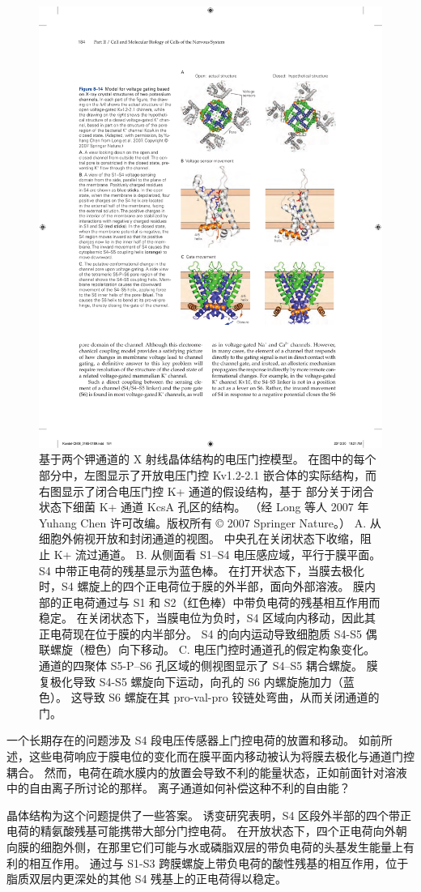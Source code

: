 \begin{figure}[htbp]
	\centering
	\includegraphics[width=0.6\linewidth]{chap08/fig_8_14}
	\caption{基于两个钾通道的 X 射线晶体结构的电压门控模型。 在图中的每个部分中，左图显示了开放电压门控 Kv1.2-2.1 嵌合体的实际结构，而右图显示了闭合电压门控 K+ 通道的假设结构，基于 部分关于闭合状态下细菌 K+ 通道 KcsA 孔区的结构。 （经 Long 等人 2007 年 Yuhang Chen 许可改编。版权所有 © 2007 Springer Nature。） A. 从细胞外俯视开放和封闭通道的视图。 中央孔在关闭状态下收缩，阻止 K+ 流过通道。 B. 从侧面看 S1–S4 电压感应域，平行于膜平面。 S4 中带正电荷的残基显示为蓝色棒。 在打开状态下，当膜去极化时，S4 螺旋上的四个正电荷位于膜的外半部，面向外部溶液。 膜内部的正电荷通过与 S1 和 S2（红色棒）中带负电荷的残基相互作用而稳定。 在关闭状态下，当膜电位为负时，S4 区域向内移动，因此其正电荷现在位于膜的内半部分。 S4 的向内运动导致细胞质 S4-S5 偶联螺旋（橙色）向下移动。 C. 电压门控时通道孔的假定构象变化。 通道的四聚体 S5-P–S6 孔区域的侧视图显示了 S4–S5 耦合螺旋。 膜复极化导致 S4-S5 螺旋向下运动，向孔的 S6 内螺旋施加力（蓝色）。 这导致 S6 螺旋在其 pro-val-pro 铰链处弯曲，从而关闭通道的门。}
	\label{fig:8_14}
\end{figure}


一个长期存在的问题涉及 S4 段电压传感器上门控电荷的放置和移动。 
如前所述，这些电荷响应于膜电位的变化而在膜平面内移动被认为将膜去极化与通道门控耦合。 
然而，电荷在疏水膜内的放置会导致不利的能量状态，正如前面针对溶液中的自由离子所讨论的那样。 
离子通道如何补偿这种不利的自由能？


晶体结构为这个问题提供了一些答案。 
诱变研究表明，S4 区段外半部的四个带正电荷的精氨酸残基可能携带大部分门控电荷。 
在开放状态下，四个正电荷向外朝向膜的细胞外侧，在那里它们可能与水或磷脂双层的带负电荷的头基发生能量上有利的相互作用。 
通过与 S1-S3 跨膜螺旋上带负电荷的酸性残基的相互作用，位于脂质双层内更深处的其他 S4 残基上的正电荷得以稳定。


